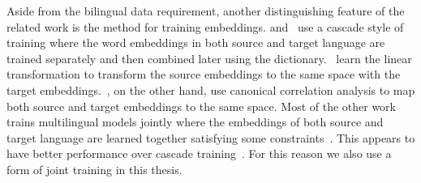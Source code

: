 \documentclass[12pt,twoside,final,hidelinks]{ltthesis}
\theoremstyle{definition}
\begin{document}
Aside from the bilingual data requirement, another distinguishing feature of the related work is the method for training embeddings.
 and~ use a cascade style of training where the word embeddings in both source and target 
language are trained separately and then combined later using the dictionary.~ learn the linear transformation to transform 
the source embeddings to the same space with the target embeddings.~, on the other hand, use canonical correlation analysis to map 
both source and target embeddings to the same space. Most of the other work trains multilingual models jointly where the embeddings of both source and target language are 
learned together satisfying some constraints~\cite{Chandar-nips-14,DBLP:journals/corr/HermannB14,icml2015_gouws15,Luong-etal:naacl15:bivec}. This appears to have better performance over cascade training~\cite{icml2015_gouws15}. For this reason we also use a form of joint training in this thesis. 
\end{document}
